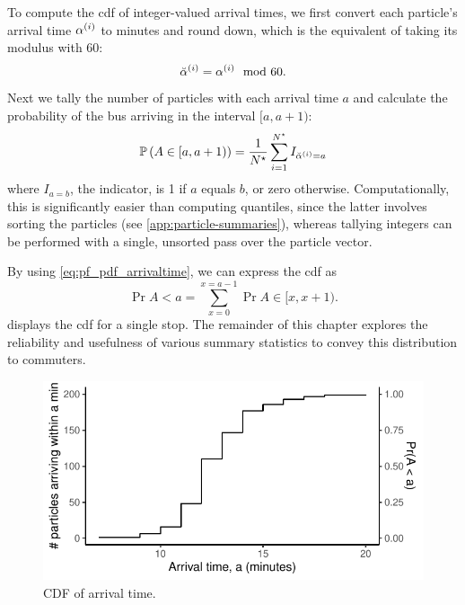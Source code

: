 To compute the \gls{cdf} of integer-valued arrival times, we first convert each particle's arrival time $\alpha^{(i)}$ to minutes and round down, which is the equivalent of taking its modulus with 60:
\begin{equation}
\label{eq:particle_eta_modulus}
\breve{\alpha}^{(i)} = \alpha^{(i)} \mod 60.
\end{equation}
Next we tally the number of particles with each arrival time $a$ and calculate the probability of the bus arriving in the interval $[a,a+1)$:
\begin{equation}
\label{eq:pf_pdf_arrivaltime}
\mathbb{P}\left(A \in [a, a+1)\right) =
\frac{1}{N^\star} \sum_{i=1}^{N^\star} I_{\breve{\alpha}^{(i)} = a}
\end{equation}
where $I_{a=b}$, the indicator, is 1 if $a$ equals $b$, or zero otherwise. Computationally, this is significantly easier than computing quantiles, since the latter involves sorting the particles (see \cref{app:particle-summaries}), whereas tallying integers can be performed with a single, unsorted pass over the particle vector.


By using \cref{eq:pf_pdf_arrivaltime}, we can express the \gls{cdf} as
\begin{equation}
\label{eq:pf_cdf_arrivaltime}
\Pr{A < a} = \sum_{x=0}^{x=a-1} \Pr{A \in [x, x+1)}.
\end{equation}
 displays the \gls{cdf} for a single stop. The remainder of this chapter explores the reliability and usefulness of various summary statistics to convey this distribution to commuters.

\begin{knitrout}\small
{}\color{fgcolor}\begin{figure}

{\centering \includegraphics[width=.6\textwidth]{figure/eta_cdf-1} 

}

\caption[CDF of arrival time]{CDF of arrival time.}\label{fig:eta_cdf}
\end{figure}


\end{knitrout}





